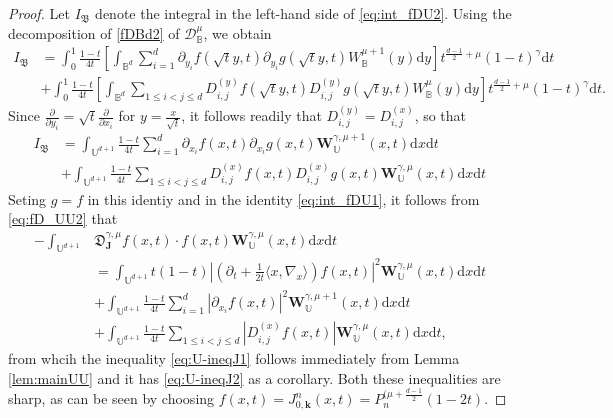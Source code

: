 \documentclass{amsart}
\theoremstyle{remark}
\def\la{{\langle}}
\def\ra{{\rangle}}
\def\d{\mathrm{d}}
\def\fB{{\mathfrak B}}
\def\fD{{\mathfrak D}}
\def\g{{\gamma}}
\def\la{{\langle}}
\def\ra{{\rangle}}
\def\kb{{\mathbf k}}
\def\Jb{{\mathbf J}}
\def\Wb{{\mathbf W}}
\def\CD{{\mathcal D}}
\def\BB{{\mathbb B}}
\def\UU{{\mathbb U}}
\def\f{\frac}
\begin{document}
\begin{proof}
Let $I_{\fB}$ denote the integral in the left-hand side of \eqref{eq:int_fDU2}. Using the decomposition of \eqref{fDBd2} 
of $\CD_\BB^\mu$, we obtain
\begin{align*}
 I_{\fB} & =  \int_0^1 \frac{1-t}{4t} \left[ \int_{\BB^d} \sum_{i=1}^d \partial_{y_i} f \left(\sqrt{t} y, t\right )
    \partial_{y_i} g\left(\sqrt{t} y, t\right)
   W_\BB^{\mu+1} (y) \d y\right]  t^{\f{d-1}{2} + \mu}(1-t)^\g \d t \\
  & +   \int_0^1 \frac{1-t}{4t} \left[ \int_{\BB^d} \sum_{1\le i< j \le d} D_{i,j}^{(y)} f \left(\sqrt{t} y, t\right )  
    D_{i,j}^{(y)} g\left(\sqrt{t} y, t\right)  W_\BB^{\mu} (y) \d y\right]  t^{\f{d-1}{2} + \mu}(1-t)^\g \d t. 
\end{align*} 
Since $\frac{\partial}{\partial y_i} = \sqrt{t} \frac{\partial}{\partial x_i}$ for $y = \frac{x}{\sqrt{t}}$, it follows
readily that $D_{i,j}^{(y)} =  D_{i,j}^{(x)}$, so that 
\begin{align*}
 I_{\fB} & =  \int_{\UU^{d+1}} \frac{1-t}{4t}   \sum_{i=1}^d \partial_{x_i} f(x,t) \partial_{x_i} g(x,t) 
 \Wb_\UU^{\g,\mu+1} (x,t) \d x \d t \\ 
  & +   \int_{\UU^{d+1}} \frac{1-t}{4t} \sum_{1\le i< j \le d} D_{i,j}^{(x)} f (x,t) D_{i,j}^{(x)} g(x,t) \Wb_\UU^{\g,\mu}(x,t) \d x \d t
\end{align*} 
Seting $g = f$ in this identiy and in the identity \eqref{eq:int_fDU1}, it follows from \eqref{eq:fD_UU2} that
\begin{align*}
 - \int_{\UU^{d+1}} & \fD_\Jb^{\g,\mu} f(x,t) \cdot f(x,t) \Wb_\UU^{\g,\mu} (x,t) \d x \d t  \\
  & =  \int_{\UU^{d+1}} t(1-t)  \left| \left( \partial_t + \frac{1}{2t} \la x ,\nabla_x\ra \right) f(x,t) \right|^2
   \Wb_{\UU}^{\g,\mu}(x,t) \d x \d t \\
  & +  \int_{\UU^{d+1}} \frac{1-t}{4t}   \sum_{i=1}^d \left| \partial_{x_i} f(x,t) \right|^2 
 \Wb_\UU^{\g,\mu+1} (x,t) \d x \d t \\ 
  & +   \int_{\UU^{d+1}} \frac{1-t}{4t} \sum_{1\le i< j \le d} \left| D_{i,j}^{(x)} f (x,t) \right |\Wb_\UU^{\g,\mu}(x,t) \d x \d t,
\end{align*}
from whcih the inequality \eqref{eq:U-ineqJ1} follows immediately from Lemma \ref{lem:mainUU} and it has 
\eqref{eq:U-ineqJ2} as a corollary. Both these inequalities are sharp, as can be seen by
choosing $f(x,t)= J_{0,\kb}^n(x,t) = P_n^{(\mu+ \f{d-1}{2}}(1-2 t)$. 
\end{proof}
 
\end{document}
